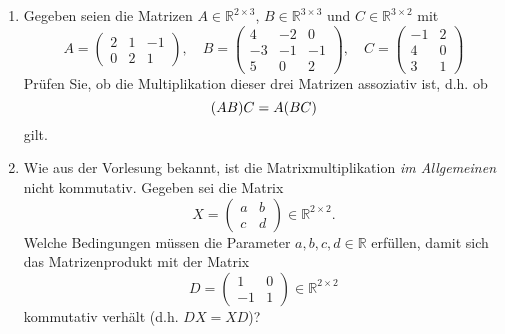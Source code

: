 \documentclass[german,12pt]{homework}
\newcommand{\RR}{\mathbb{R}}
\DeclarePairedDelimiter{\enbrace}{(}{)}
\begin{document}
    \begin{problem}
        \begin{enumerate}
            \item Gegeben seien die Matrizen \(A \in \RR^{2 \times 3}\), \(B \in \RR^{3 \times 3}\) und \(C \in \RR^{3 \times 2}\) mit
            \[A = \begin{pmatrix}
                2 & 1 & -1\\
                0 & 2 & 1
            \end{pmatrix}, \quad B = \begin{pmatrix}
                4 & -2 & 0\\
                -3 & -1 & -1\\
                5 & 0 & 2
            \end{pmatrix}, \quad C = \begin{pmatrix}
                -1 & 2\\
                4 & 0\\
                3 & 1
            \end{pmatrix}\]
            Prüfen Sie, ob die Multiplikation dieser drei Matrizen assoziativ ist, d.h. ob
            \[\enbrace*{AB}C = A\enbrace*{BC}\]
            gilt.
            \item Wie aus der Vorlesung bekannt, ist die Matrixmultiplikation \emph{im Allgemeinen} nicht kommutativ. Gegeben sei die Matrix
            \[X = \begin{pmatrix}
                a & b\\
                c & d
            \end{pmatrix} \in \RR^{2 \times 2}.\]
            Welche Bedingungen müssen die Parameter \(a, b, c, d \in \RR\) erfüllen, damit sich das Matrizenprodukt mit der Matrix
            \[D = \begin{pmatrix}
                1 & 0\\
                -1 & 1
            \end{pmatrix} \in \RR^{2 \times 2}\]
            kommutativ verhält (d.h. \(DX = XD\))?
        \end{enumerate}
    \end{problem}
\end{document}
